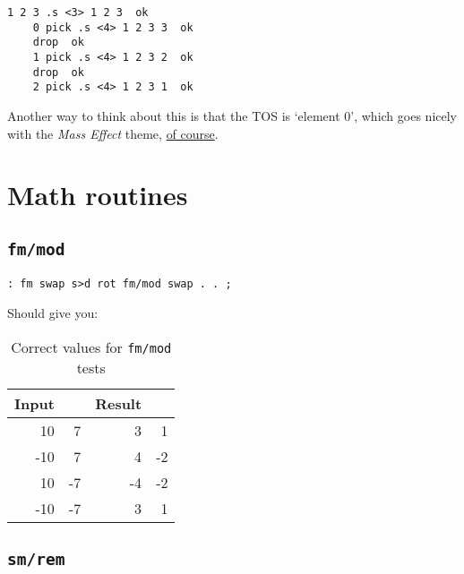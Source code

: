 \begin{lstlisting}[frame=lines]
	1 2 3 .s <3> 1 2 3  ok
	0 pick .s <4> 1 2 3 3  ok
	drop  ok
	1 pick .s <4> 1 2 3 2  ok
	drop  ok
	2 pick .s <4> 1 2 3 1  ok
\end{lstlisting}

\noindent Another way to think about this is that the TOS is `element 0', which
goes nicely with the \textit{Mass Effect} theme, \href{http://masseffect.wikia.com/wiki/Element\_Zero}{of
course}.


\section{Math routines}



\subsection{\texttt{fm/mod}}

\begin{lstlisting}[frame=lines]
        : fm swap s>d rot fm/mod swap . . ; 
\end{lstlisting}

\noindent Should give you: 

\begin{table}[h!]
\centering
\begin{tabular}{ | r r || r r | }
        \hline
	Input & & Result & \\
        \hline
         10 &  7 &  3 &  1\\
        -10 &  7 &  4 & -2 \\
         10 & -7 & -4 & -2\\
        -10 & -7 &  3 &  1\\
        \hline
\end{tabular}
        \caption{Correct values for \texttt{fm/mod} tests}
        \label{table_fmmod}
\end{table}


\subsection{\texttt{sm/rem}}

